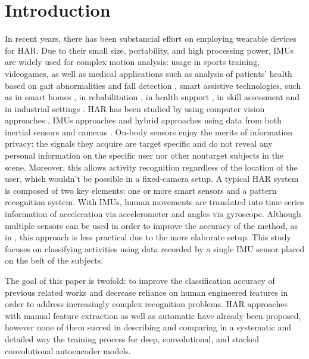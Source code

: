 
\section{Introduction}
\label{sec:introduction}

In recent years, there has been substancial effort on employing wearable devices for HAR. Due to their small size, portability, and high processing power, IMUs are widely used for complex motion analysis: usage in sports training, videogames, as well as medical applications such as analysis of patients' health based on gait abnormalities and fall detection \cite{Yamada-2012}, smart assistive technologies, such as in smart homes \cite{Parisa-2009}, in rehabilitation \cite{Shyamal-2012}, in health support \cite{Akin-2010}, in skill assessment \cite{Matthias-2013} and in industrial settings \cite{Thomas-2008}.
HAR has been studied by using computer vision approaches \cite{Hueihan-2013,Ferda-2013}, IMUs approaches \cite{jian-2015,nils-2016,Valarezo-2017} and hybrid approaches using data from both inertial sensors and cameras \cite{2017-mfi-actionrecognition}.
\mbox{On-body} sensors enjoy the merits of information privacy: the signals they acquire are target specific and do not reveal any personal information on the specific user nor other nontarget subjects in the scene. Moreover, this allows activity recognition regardless of the location of the user, which wouldn't be possible in a \mbox{fixed-camera} setup.
A typical HAR system is composed of two key elements: one or more smart sensors and a pattern recognition system. With IMUs, human movements are translated into time series information of acceleration via accelerometer and angles via gyroscope. Although multiple sensors can be used in order to improve the accuracy of the method, as in \cite{Grzezick-2017}, this approach is less practical due to the more elaborate setup. This study focuses on classifying activities using data recorded by a single IMU sensor placed on the belt of the subjects. \par
The goal of this paper is twofold: to improve the classification accuracy of previous related works and decrease reliance on human engineered features in order to address increasingly complex recognition problems.
HAR approaches with manual feature extraction \cite{base-paper} as well as automatic \cite{jian-2015, nils-2016, Valarezo-2017} have already been proposed, however none of them succed in describing and comparing in a systematic and detailed way the training process for deep, convolutional, and stacked convolutional autoencoder models. \par
